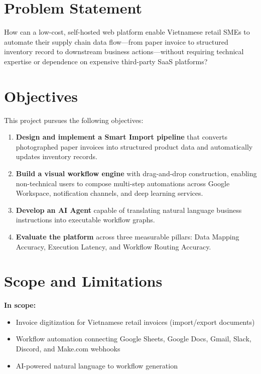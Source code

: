 \documentclass[11pt,a4paper]{report}
\begin{document}
\section{Problem Statement}

How can a low-cost, self-hosted web platform enable Vietnamese retail SMEs to automate their supply chain data flow---from paper invoice to structured inventory record to downstream business actions---without requiring technical expertise or dependence on expensive third-party SaaS platforms?

\section{Objectives}

This project pursues the following objectives:

\begin{enumerate}
  \item \textbf{Design and implement a Smart Import pipeline} that converts photographed paper invoices into structured product data and automatically updates inventory records.
  \item \textbf{Build a visual workflow engine} with drag-and-drop construction, enabling non-technical users to compose multi-step automations across Google Workspace, notification channels, and deep learning services.
  \item \textbf{Develop an AI Agent} capable of translating natural language business instructions into executable workflow graphs.
  \item \textbf{Evaluate the platform} across three measurable pillars: Data Mapping Accuracy, Execution Latency, and Workflow Routing Accuracy.
\end{enumerate}

\section{Scope and Limitations}

\textbf{In scope:}
\begin{itemize}
  \item Invoice digitization for Vietnamese retail invoices (import/export documents)
  \item Workflow automation connecting Google Sheets, Google Docs, Gmail, Slack, Discord, and Make.com webhooks
  \item AI-powered natural language to workflow generation
\end{itemize}
\end{document}

